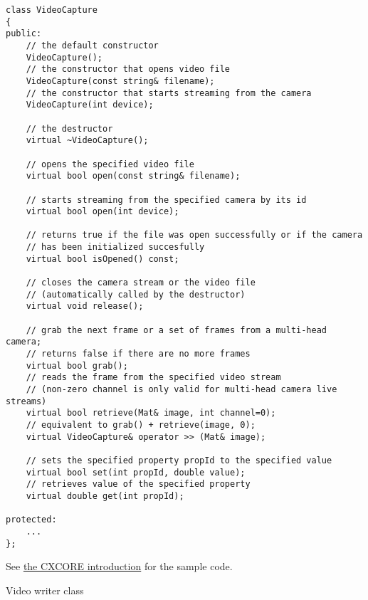 \begin{lstlisting}
class VideoCapture
{
public:
    // the default constructor
    VideoCapture();
    // the constructor that opens video file
    VideoCapture(const string& filename);
    // the constructor that starts streaming from the camera
    VideoCapture(int device);
    
    // the destructor
    virtual ~VideoCapture();
    
    // opens the specified video file
    virtual bool open(const string& filename);
    
    // starts streaming from the specified camera by its id
    virtual bool open(int device);
    
    // returns true if the file was open successfully or if the camera
    // has been initialized succesfully
    virtual bool isOpened() const;
    
    // closes the camera stream or the video file
    // (automatically called by the destructor)
    virtual void release();
    
    // grab the next frame or a set of frames from a multi-head camera;
    // returns false if there are no more frames
    virtual bool grab();
    // reads the frame from the specified video stream
    // (non-zero channel is only valid for multi-head camera live streams)
    virtual bool retrieve(Mat& image, int channel=0);
    // equivalent to grab() + retrieve(image, 0);
    virtual VideoCapture& operator >> (Mat& image);
    
    // sets the specified property propId to the specified value 
    virtual bool set(int propId, double value);
    // retrieves value of the specified property
    virtual double get(int propId);
    
protected:
    ...
};
\end{lstlisting}

See \hyperref[AutomaticMemoryManagement2]{the CXCORE introduction} for the sample code.

\label{VideoWriter}
Video writer class

